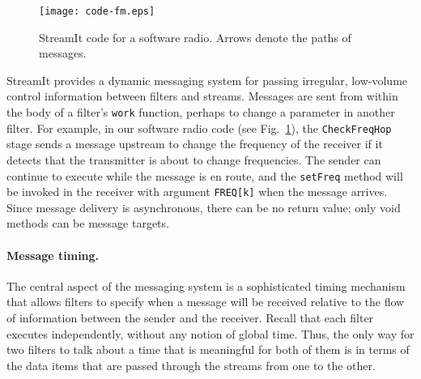 
\begin{figure}
\texttt{[image: code-fm.eps]}
\caption{StreamIt code for a software radio.  Arrows denote the paths
  of messages.}
\label{fig:radiocode}
\end{figure}


StreamIt provides a dynamic messaging system for passing irregular,
low-volume control information between filters and streams.  Messages
are sent from within the body of a filter's \texttt{work} function,
perhaps to change a parameter in another filter.  For example, in our
software radio code (see Fig.~\ref{fig:radiocode}), the
\texttt{CheckFreqHop} stage sends a message upstream to change the
frequency of the receiver if it detects that the transmitter is about
to change frequencies.  The sender can continue to execute while the
message is en route, and the \texttt{setFreq} method will be invoked
in the receiver with argument \texttt{FREQ[k]} when the message
arrives.  Since message delivery is asynchronous, there can be no
return value; only void methods can be message targets.

\paragraph{Message timing.}  The central aspect of the messaging system is a
sophisticated timing mechanism that allows filters to specify when a
message will be received relative to the flow of information between
the sender and the receiver.  Recall that each filter executes
independently, without any notion of global time.  Thus, the only way
for two filters to talk about a time that is meaningful for both of
them is in terms of the data items that are passed through the streams
from one to the other.

